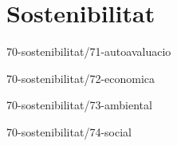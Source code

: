 \chapter{Sostenibilitat}


{70-sostenibilitat/71-autoavaluacio}

{70-sostenibilitat/72-economica}

{70-sostenibilitat/73-ambiental}

{70-sostenibilitat/74-social}
